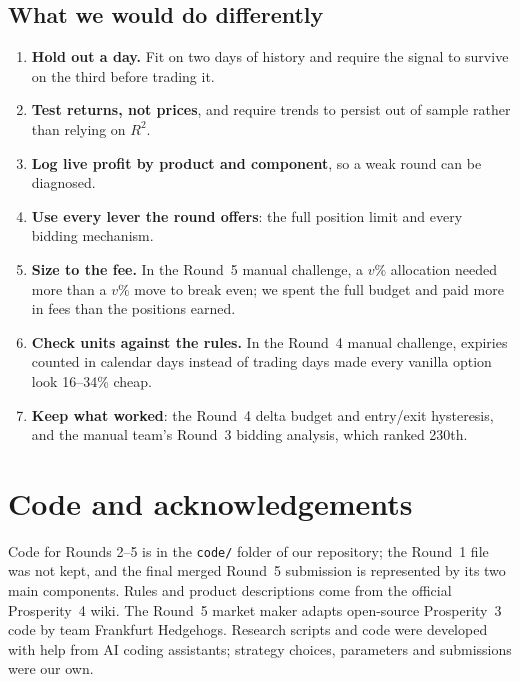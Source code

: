 \documentclass[11pt,a4paper]{article}
\begin{document}
\subsection*{What we would do differently}
\begin{enumerate}\setlength\itemsep{0.1em}
\item \textbf{Hold out a day.} Fit on two days of history and require the signal to survive on the third before
trading it.
\item \textbf{Test returns, not prices}, and require trends to persist out of sample rather than relying on $R^2$.
\item \textbf{Log live profit by product and component}, so a weak round can be diagnosed.
\item \textbf{Use every lever the round offers}: the full position limit and every bidding mechanism.
\item \textbf{Size to the fee.} In the Round~5 manual challenge, a $v\%$ allocation needed more than a $v\%$ move
to break even; we spent the full budget and paid more in fees than the positions earned.
\item \textbf{Check units against the rules.} In the Round~4 manual challenge, expiries counted in calendar
days instead of trading days made every vanilla option look 16--34\% cheap.
\item \textbf{Keep what worked}: the Round~4 delta budget and entry/exit hysteresis, and the manual team's
Round~3 bidding analysis, which ranked 230th.
\end{enumerate}

\FloatBarrier
\section*{Code and acknowledgements}
Code for Rounds 2--5 is in the \texttt{code/} folder of our repository; the Round~1 file was not kept, and the
final merged Round~5 submission is represented by its two main components. Rules and product descriptions come
from the official Prosperity~4 wiki. The Round~5 market maker adapts open-source Prosperity~3 code by team
Frankfurt Hedgehogs. Research scripts and code were developed with help from AI coding assistants; strategy
choices, parameters and submissions were our own.
\end{document}
